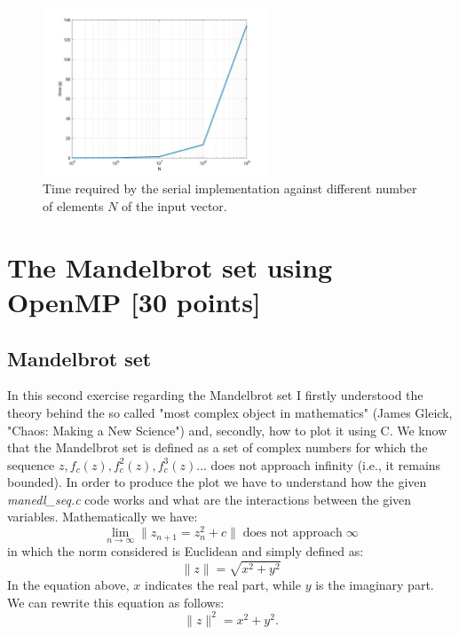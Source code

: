\documentclass[unicode,11pt,a4paper,oneside,numbers=endperiod,openany]{scrartcl}
\begin{document}
\begin{figure}[h!]
\centering
\includegraphics[width=0.6\textwidth]{Figures/serialLog.jpg}
\caption{Time required by the serial implementation against different number of elements $N$ of the input vector.}\label{fig:criticalEff}
\end{figure}

 
\section{The Mandelbrot set using OpenMP [30 points]}
\subsection{Mandelbrot set}
In this second exercise regarding the Mandelbrot set I firstly understood the theory behind the so called "most complex object in mathematics" (James Gleick, "Chaos: Making a New Science") and, secondly, how to plot it using C. We know that the Mandelbrot set is defined as a set of complex numbers for which the sequence $z,f_c(z),f_c^2(z),f_c^3(z)...$ does not approach infinity (i.e., it remains bounded). In order to produce the plot we have to understand how the given \textit{manedl\_seq.c} code works and what are the interactions between the given variables. Mathematically we have:
\begin{equation*}
	\lim_{n \rightarrow \infty}\|z_{n+1} = z_n^2 + c \| \;\text{does not approach}\; \infty
\end{equation*}
in which the norm considered is Euclidean and simply defined as:
\begin{equation*}
	\|z\| = \sqrt{x^2 + y^2}
\end{equation*}
In the equation above, $x$ indicates the real part, while $y$ is the imaginary part. We can rewrite this equation as follows:
\begin{equation*}
	\|z\|^2 = x^2 + y^2.
\end{equation*}
\end{document}
